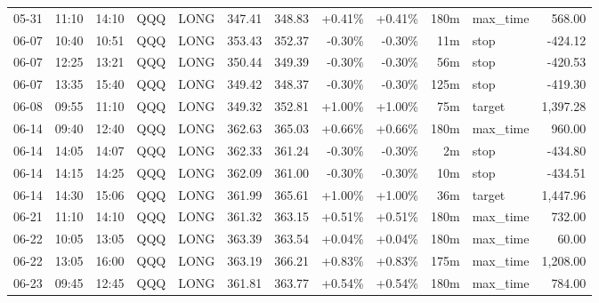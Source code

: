 \documentclass[11pt,a4paper]{article}
\begin{document}
\begin{center}
\begin{longtable}{>{\color{txtmain}}l l l l l r r r r r >{\color{txtmain}}l r}
05-31 & 11:10 & 14:10 & QQQ & LONG & 347.41 & 348.83 & \textcolor{wingreen}{+0.41\%} & \textcolor{wingreen}{+0.41\%} & 180m & max\_time & \textcolor{wingreen}{568.00} \\
06-07 & 10:40 & 10:51 & QQQ & LONG & 353.43 & 352.37 & \textcolor{lossred}{-0.30\%} & \textcolor{lossred}{-0.30\%} & 11m & stop & \textcolor{lossred}{-424.12} \\
06-07 & 12:25 & 13:21 & QQQ & LONG & 350.44 & 349.39 & \textcolor{lossred}{-0.30\%} & \textcolor{lossred}{-0.30\%} & 56m & stop & \textcolor{lossred}{-420.53} \\
06-07 & 13:35 & 15:40 & QQQ & LONG & 349.42 & 348.37 & \textcolor{lossred}{-0.30\%} & \textcolor{lossred}{-0.30\%} & 125m & stop & \textcolor{lossred}{-419.30} \\
06-08 & 09:55 & 11:10 & QQQ & LONG & 349.32 & 352.81 & \textcolor{wingreen}{+1.00\%} & \textcolor{wingreen}{+1.00\%} & 75m & target & \textcolor{wingreen}{1,397.28} \\
06-14 & 09:40 & 12:40 & QQQ & LONG & 362.63 & 365.03 & \textcolor{wingreen}{+0.66\%} & \textcolor{wingreen}{+0.66\%} & 180m & max\_time & \textcolor{wingreen}{960.00} \\
06-14 & 14:05 & 14:07 & QQQ & LONG & 362.33 & 361.24 & \textcolor{lossred}{-0.30\%} & \textcolor{lossred}{-0.30\%} & 2m & stop & \textcolor{lossred}{-434.80} \\
06-14 & 14:15 & 14:25 & QQQ & LONG & 362.09 & 361.00 & \textcolor{lossred}{-0.30\%} & \textcolor{lossred}{-0.30\%} & 10m & stop & \textcolor{lossred}{-434.51} \\
06-14 & 14:30 & 15:06 & QQQ & LONG & 361.99 & 365.61 & \textcolor{wingreen}{+1.00\%} & \textcolor{wingreen}{+1.00\%} & 36m & target & \textcolor{wingreen}{1,447.96} \\
06-21 & 11:10 & 14:10 & QQQ & LONG & 361.32 & 363.15 & \textcolor{wingreen}{+0.51\%} & \textcolor{wingreen}{+0.51\%} & 180m & max\_time & \textcolor{wingreen}{732.00} \\
06-22 & 10:05 & 13:05 & QQQ & LONG & 363.39 & 363.54 & \textcolor{wingreen}{+0.04\%} & \textcolor{wingreen}{+0.04\%} & 180m & max\_time & \textcolor{wingreen}{60.00} \\
06-22 & 13:05 & 16:00 & QQQ & LONG & 363.19 & 366.21 & \textcolor{wingreen}{+0.83\%} & \textcolor{wingreen}{+0.83\%} & 175m & max\_time & \textcolor{wingreen}{1,208.00} \\
06-23 & 09:45 & 12:45 & QQQ & LONG & 361.81 & 363.77 & \textcolor{wingreen}{+0.54\%} & \textcolor{wingreen}{+0.54\%} & 180m & max\_time & \textcolor{wingreen}{784.00} \\

\end{longtable}
\end{center}
\end{document}
